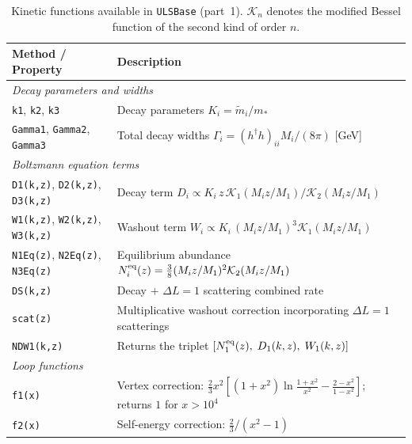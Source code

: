 \documentclass[12pt, a4paper]{article}
\begin{document}
\begin{table}[H]
\centering\small
\renewcommand{\arraystretch}{1.25}
\begin{tabular}{p{5.0cm} p{9.0cm}}
\hline
\textbf{Method / Property} & \textbf{Description} \\
\hline
\multicolumn{2}{l}{\textit{Decay parameters and widths}} \\
\texttt{k1}, \texttt{k2}, \texttt{k3}
  & Decay parameters $K_i=\tilde{m}_i/m_*$ \\
\texttt{Gamma1}, \texttt{Gamma2}, \texttt{Gamma3}
  & Total decay widths $\Gamma_i=(h^\dagger h)_{ii}M_i/(8\pi)$ [GeV] \\
\hline
\multicolumn{2}{l}{\textit{Boltzmann equation terms}} \\
\texttt{D1(k,z)}, \texttt{D2(k,z)}, \texttt{D3(k,z)}
  & Decay term $D_i\propto K_i\,z\,\mathcal{K}_1(M_iz/M_1)/\mathcal{K}_2(M_iz/M_1)$ \\
\texttt{W1(k,z)}, \texttt{W2(k,z)}, \texttt{W3(k,z)}
  & Washout term $W_i\propto K_i\,(M_iz/M_1)^3\mathcal{K}_1(M_iz/M_1)$ \\
\texttt{N1Eq(z)}, \texttt{N2Eq(z)}, \texttt{N3Eq(z)}
  & Equilibrium abundance $N_i^{\rm eq}(z)=\tfrac{3}{8}(M_iz/M_1)^2\mathcal{K}_2(M_iz/M_1)$ \\
\texttt{DS(k,z)}   & Decay $+$ $\Delta L=1$ scattering combined rate \\
\texttt{scat(z)}   & Multiplicative washout correction incorporating $\Delta L=1$
                     scatterings \\
\texttt{NDW1(k,z)} & Returns the triplet
                     $[N_1^{\rm eq}(z),\;D_1(k,z),\;W_1(k,z)]$ \\
\hline
\multicolumn{2}{l}{\textit{Loop functions}} \\
\texttt{f1(x)}
  & Vertex correction:
    $\tfrac{2}{3}x^2\!\left[(1+x^2)\ln\tfrac{1+x^2}{x^2}-\tfrac{2-x^2}{1-x^2}\right]$;\;
    returns $1$ for $x>10^4$ \\
\texttt{f2(x)}
  & Self-energy correction: $\tfrac{2}{3}/(x^2-1)$ \\
\hline
\end{tabular}
\caption{Kinetic functions available in \texttt{ULSBase} (part~1).
$\mathcal{K}_n$ denotes the modified Bessel function of the second kind of order $n$.}
\label{tab:ulsbase_kinetic1}
\end{table}
\end{document}
